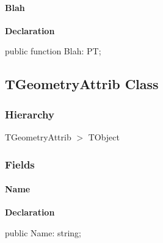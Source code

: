 \documentclass{report}
\begin{document}
\paragraph*{Blah}\hspace*{\fill}

\begin{list}{}{
\setlength{\itemindent}{0cm}
\setlength{\listparindent}{0cm}
\setlength{\leftmargin}{\evensidemargin}
\addtolength{\leftmargin}{\tmplength}
\settowidth{\labelsep}{X}
\addtolength{\leftmargin}{\labelsep}
\setlength{\labelwidth}{\tmplength}
}
\begin{flushleft}
\item[\textbf{Declaration}\hfill]
\begin{ttfamily}
public function Blah: PT;\end{ttfamily}


\end{flushleft}
\end{list}
\subsection*{TGeometryAttrib Class}
\subsubsection*{\large{\textbf{Hierarchy}}\normalsize\hspace{1ex}\hfill}
TGeometryAttrib {$>$} TObject
\subsubsection*{\large{\textbf{Fields}}\normalsize\hspace{1ex}\hfill}
\paragraph*{Name}\hspace*{\fill}

\begin{list}{}{
\setlength{\itemindent}{0cm}
\setlength{\listparindent}{0cm}
\setlength{\leftmargin}{\evensidemargin}
\addtolength{\leftmargin}{\tmplength}
\settowidth{\labelsep}{X}
\addtolength{\leftmargin}{\labelsep}
\setlength{\labelwidth}{\tmplength}
}
\begin{flushleft}
\item[\textbf{Declaration}\hfill]
\begin{ttfamily}
public Name: string;\end{ttfamily}


\end{flushleft}
\end{list}
\end{document}
